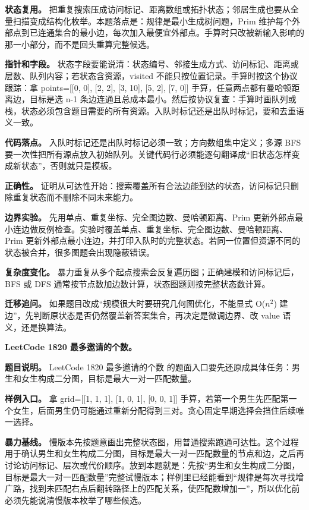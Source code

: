 \textbf{状态复用。} 把重复搜索压成访问标记、距离数组或拓扑状态；邻居生成也要从全量扫描变成结构化枚举。本题落点是：规律是最小生成树问题，Prim 维护每个外部点到已连通集合的最小边，每次加入最便宜外部点。手算时只改被新输入影响的那一小部分，而不是回头重算完整候选。

\textbf{指针和字段。} 状态字段要能说清：状态编号、邻接生成方式、访问标记、距离或层数、队列内容；若状态含资源，visited 不能只按位置记录。手算时按这个协议跟踪：拿 points=[[0, 0], [2, 2], [3, 10], [5, 2], [7, 0]] 手算，任意两点都有曼哈顿距离边，目标是选 n-1 条边连通且总成本最小。然后按协议复查：手算时画队列或栈，状态必须包含题目需要的所有资源。入队时标记还是出队时标记，要和去重语义一致。

\textbf{代码落点。} 入队时标记还是出队时标记必须一致；方向数组集中定义；多源 BFS 要一次性把所有源点放入初始队列。关键代码行必须能逐句翻译成“旧状态怎样变成新状态”，否则就只是模板。

\textbf{正确性。} 证明从可达性开始：搜索覆盖所有合法边能到达的状态，访问标记只删除重复状态而不删除不同未来能力。

\textbf{边界实验。} 先用单点、重复坐标、完全图边数、曼哈顿距离、Prim 更新外部点最小连边做反例检查。实验时覆盖单点、重复坐标、完全图边数、曼哈顿距离、Prim 更新外部点最小连边，并打印入队时的完整状态。若同一位置但资源不同的状态被合并，很多图题会出现隐蔽错误。

\textbf{复杂度变化。} 暴力重复从多个起点搜索会反复遍历图；正确建模和访问标记后，BFS 或 DFS 通常按节点数加边数计算，状态图题则按完整状态数计算。

\textbf{迁移追问。} 如果题目改成“规模很大时要研究几何图优化，不能显式 O(\ensuremath{n^{2}}) 建边”，先判断原状态是否仍然覆盖新答案集合，再决定是微调边界、改 value 语义，还是换算法。

\noindent\textbf{LeetCode 1820 最多邀请的个数。}

\textbf{题目说明。} LeetCode 1820 最多邀请的个数 的题面入口要先还原成具体任务：男生和女生构成二分图，目标是最大一对一匹配数量。

\textbf{样例入口。} 拿 grid=[[1, 1, 1], [1, 0, 1], [0, 0, 1]] 手算，若第一个男生先匹配第一个女生，后面男生仍可能通过重新分配得到三对。贪心固定早期选择会挡住后续唯一选择。

\textbf{暴力基线。} 慢版本先按题意画出完整状态图，用普通搜索跑通可达性。这个过程用于确认男生和女生构成二分图，目标是最大一对一匹配数量的节点和边，之后再讨论访问标记、层次或代价顺序。放到本题就是：先按“男生和女生构成二分图，目标是最大一对一匹配数量”完整试慢版本；样例里已经能看到“规律是每次寻找增广路，找到未匹配右点后翻转路径上的匹配关系，使匹配数增加一”，所以优化前必须先能说清慢版本枚举了哪些候选。

